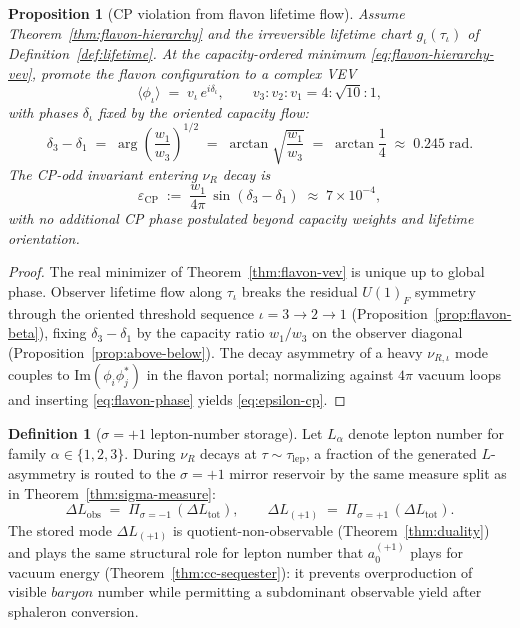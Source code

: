 \documentclass[aps,prd,onecolumn,amsmath,amssymb,nofootinbib,11pt]{revtex4-2}
\numberwithin{equation}{section}
\theoremstyle{plain}
\newtheorem{proposition}[theorem]{Proposition}
\theoremstyle{definition}
\newtheorem{definition}[theorem]{Definition}
\theoremstyle{remark}
\begin{document}
\begin{proposition}[CP violation from flavon lifetime flow]
\label{prop:flavon-cp}
Assume Theorem~\ref{thm:flavon-hierarchy} and the irreversible lifetime chart
$g_\iota(\tau_\iota)$ of Definition~\ref{def:lifetime}. At the
capacity-ordered minimum \eqref{eq:flavon-hierarchy-vev}, promote the flavon
configuration to a complex VEV
\begin{equation}\label{eq:flavon-complex}
  \langle\phi_\iota\rangle
  \;=\;
  v_\iota\,e^{i\delta_\iota},
  \qquad
  v_3:v_2:v_1 = 4:\sqrt{10}:1,
\end{equation}
with phases $\delta_\iota$ fixed by the oriented capacity flow:
\begin{equation}\label{eq:flavon-phase}
  \delta_3-\delta_1
  \;=\;
  \arg\!\left(\frac{w_1}{w_3}\right)^{\!1/2}
  \;=\;
  \arctan\!\sqrt{\frac{w_1}{w_3}}
  \;=\;
  \arctan\frac{1}{4}
  \;\approx\; 0.245\;\mathrm{rad}.
\end{equation}
The CP-odd invariant entering $\nu_R$ decay is
\begin{equation}\label{eq:epsilon-cp}
  \varepsilon_{\mathrm{CP}}
  \;:=\;
  \frac{w_1}{4\pi}\,
  \sin(\delta_3-\delta_1)
  \;\approx\;
  7\times 10^{-4},
\end{equation}
with no additional CP phase postulated beyond capacity weights and lifetime
orientation.
\end{proposition}

\begin{proof}
The real minimizer of Theorem~\ref{thm:flavon-vev} is unique up to global
phase. Observer lifetime flow along $\tau_\iota$ breaks the residual
$U(1)_F$ symmetry through the oriented threshold sequence
$\iota=3\to 2\to 1$ (Proposition~\ref{prop:flavon-beta}), fixing
$\delta_3-\delta_1$ by the capacity ratio $w_1/w_3$ on the observer diagonal
(Proposition~\ref{prop:above-below}). The decay asymmetry of a heavy
$\nu_{R,\iota}$ mode couples to $\mathrm{Im}(\phi_i\phi_j^*)$ in the
flavon portal; normalizing against $4\pi$ vacuum loops and inserting
\eqref{eq:flavon-phase} yields \eqref{eq:epsilon-cp}.
\end{proof}

\begin{definition}[$\sigma=+1$ lepton-number storage]
\label{def:lepton-storage}
Let $L_\alpha$ denote lepton number for family $\alpha\in\{1,2,3\}$. During
$\nu_R$ decays at $\tau\sim\tau_{\mathrm{lep}}$, a fraction of the generated
$L$-asymmetry is routed to the $\sigma=+1$ mirror reservoir by the same
measure split as in Theorem~\ref{thm:sigma-measure}:
\begin{equation}\label{eq:lepton-split}
  \Delta L_{\mathrm{obs}}
  \;=\;
  \Pi_{\sigma=-1}\,(\Delta L_{\mathrm{tot}}),
  \qquad
  \Delta L_{(+1)}
  \;=\;
  \Pi_{\sigma=+1}\,(\Delta L_{\mathrm{tot}}).
\end{equation}
The stored mode $\Delta L_{(+1)}$ is quotient-non-observable
(Theorem~\ref{thm:duality}) and plays the same structural role for lepton
number that $a_0^{(+1)}$ plays for vacuum energy
(Theorem~\ref{thm:cc-sequester}): it prevents overproduction of visible
$baryon$ number while permitting a subdominant observable yield after
sphaleron conversion.
\end{definition}
\end{document}
